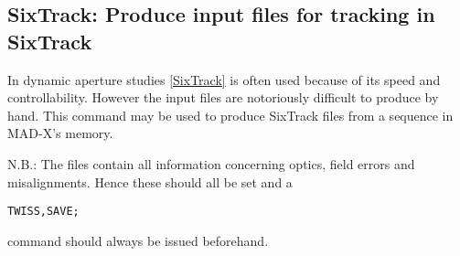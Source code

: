 



\subsection{SixTrack: Produce input files for tracking in SixTrack}
 In dynamic aperture studies \href{../Introduction/bibliography.html#SixTrack}{[SixTrack]} is often used because of its  speed and controllability. However the input files are notoriously difficult  to produce by hand. This command may be used to produce SixTrack files from  a sequence in MAD-X's memory. 
 
   N.B.: The files contain all information concerning optics, field errors  and misalignments. Hence these should all be set and a  
\begin{verbatim}
TWISS,SAVE;\end{verbatim} command should always be issued beforehand.


